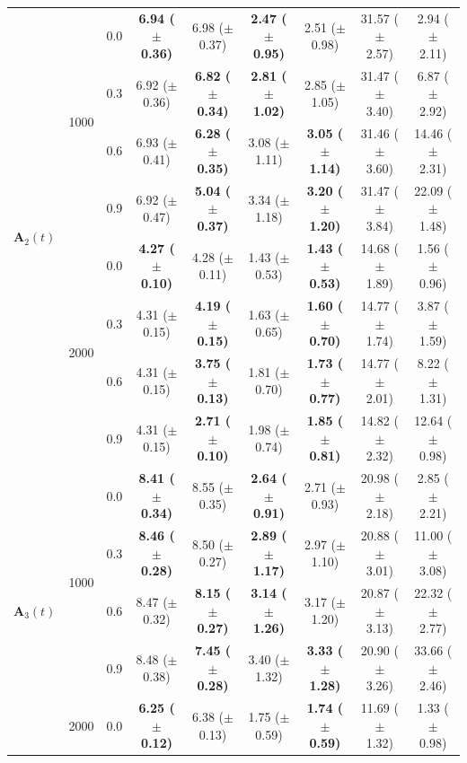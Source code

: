 \begin{table}[htbp]
{\begin{tabular}{lll|cc|cc|cc}
\hline
\multirow{8}{*}{$\mathbf{A}_2(t)$} & \multirow{4}{*}{1000} & 0.0 & \textbf{6.94 ($\pm$ 0.36)} & 6.98 ($\pm$ 0.37) & \textbf{2.47 ($\pm$ 0.95)} & 2.51 ($\pm$ 0.98) & 31.57 ($\pm$ 2.57) & 2.94 ($\pm$ 2.11) \\
 &  & 0.3 & 6.92 ($\pm$ 0.36) & \textbf{6.82 ($\pm$ 0.34)} & \textbf{2.81 ($\pm$ 1.02)} & 2.85 ($\pm$ 1.05) & 31.47 ($\pm$ 3.40) & 6.87 ($\pm$ 2.92) \\
 &  & 0.6 & 6.93 ($\pm$ 0.41) & \textbf{6.28 ($\pm$ 0.35)} & 3.08 ($\pm$ 1.11) & \textbf{3.05 ($\pm$ 1.14)} & 31.46 ($\pm$ 3.60) & 14.46 ($\pm$ 2.31) \\
 &  & 0.9 & 6.92 ($\pm$ 0.47) & \textbf{5.04 ($\pm$ 0.37)} & 3.34 ($\pm$ 1.18) & \textbf{3.20 ($\pm$ 1.20)} & 31.47 ($\pm$ 3.84) & 22.09 ($\pm$ 1.48) \\
\cline{2-9}
 & \multirow{4}{*}{2000} & 0.0 & \textbf{4.27 ($\pm$ 0.10)} & 4.28 ($\pm$ 0.11) & 1.43 ($\pm$ 0.53) & \textbf{1.43 ($\pm$ 0.53)} & 14.68 ($\pm$ 1.89) & 1.56 ($\pm$ 0.96) \\
 &  & 0.3 & 4.31 ($\pm$ 0.15) & \textbf{4.19 ($\pm$ 0.15)} & 1.63 ($\pm$ 0.65) & \textbf{1.60 ($\pm$ 0.70)} & 14.77 ($\pm$ 1.74) & 3.87 ($\pm$ 1.59) \\
 &  & 0.6 & 4.31 ($\pm$ 0.15) & \textbf{3.75 ($\pm$ 0.13)} & 1.81 ($\pm$ 0.70) & \textbf{1.73 ($\pm$ 0.77)} & 14.77 ($\pm$ 2.01) & 8.22 ($\pm$ 1.31) \\
 &  & 0.9 & 4.31 ($\pm$ 0.15) & \textbf{2.71 ($\pm$ 0.10)} & 1.98 ($\pm$ 0.74) & \textbf{1.85 ($\pm$ 0.81)} & 14.82 ($\pm$ 2.32) & 12.64 ($\pm$ 0.98) \\
\hline
\multirow{8}{*}{$\mathbf{A}_3(t)$} & \multirow{4}{*}{1000} & 0.0 & \textbf{8.41 ($\pm$ 0.34)} & 8.55 ($\pm$ 0.35) & \textbf{2.64 ($\pm$ 0.91)} & 2.71 ($\pm$ 0.93) & 20.98 ($\pm$ 2.18) & 2.85 ($\pm$ 2.21) \\
 &  & 0.3 & \textbf{8.46 ($\pm$ 0.28)} & 8.50 ($\pm$ 0.27) & \textbf{2.89 ($\pm$ 1.17)} & 2.97 ($\pm$ 1.10) & 20.88 ($\pm$ 3.01) & 11.00 ($\pm$ 3.08) \\
 &  & 0.6 & 8.47 ($\pm$ 0.32) & \textbf{8.15 ($\pm$ 0.27)} & \textbf{3.14 ($\pm$ 1.26)} & 3.17 ($\pm$ 1.20) & 20.87 ($\pm$ 3.13) & 22.32 ($\pm$ 2.77) \\
 &  & 0.9 & 8.48 ($\pm$ 0.38) & \textbf{7.45 ($\pm$ 0.28)} & 3.40 ($\pm$ 1.32) & \textbf{3.33 ($\pm$ 1.28)} & 20.90 ($\pm$ 3.26) & 33.66 ($\pm$ 2.46) \\
\cline{2-9}
 & \multirow{4}{*}{2000} & 0.0 & \textbf{6.25 ($\pm$ 0.12)} & 6.38 ($\pm$ 0.13) & 1.75 ($\pm$ 0.59) & \textbf{1.74 ($\pm$ 0.59)} & 11.69 ($\pm$ 1.32) & 1.33 ($\pm$ 0.98) \\

\end{tabular}}
\end{table}
